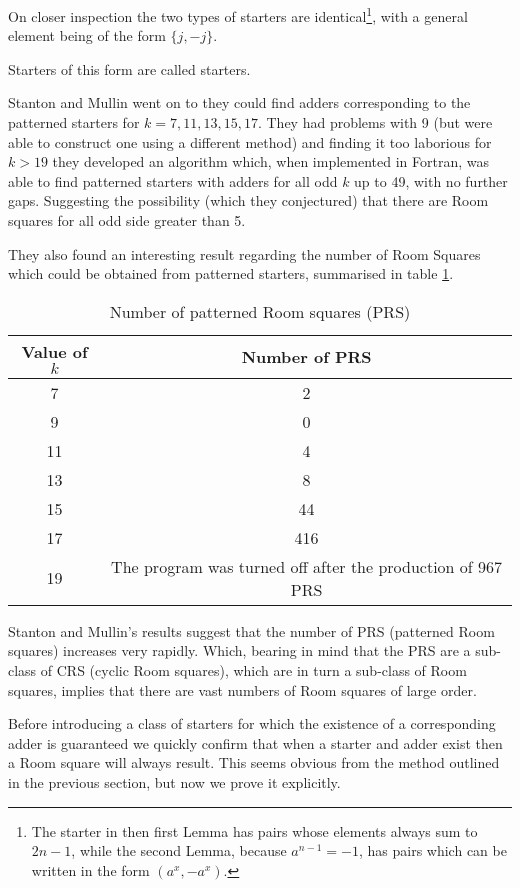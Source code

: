 On closer inspection the two types of starters are identical\footnote{The starter in then first Lemma has pairs whose elements always sum to $2n-1$, while the second Lemma, because $a^{n-1}=-1$, has pairs which can be written in the form $(a^x,-a^x)$.}, with a general element being of the form $\{j, -j\}$.

Starters of this form are called  starters.

Stanton and Mullin went on to they could find adders corresponding to the patterned starters for $k = 7, 11, 13, 15, 17$.
They had problems with 9 (but were able to construct one using a different method) and finding it too laborious for $k > 19$ they developed an algorithm which, when implemented in Fortran, was able to find patterned starters with adders for all odd $k$ up to 49, with no further gaps.
Suggesting the possibility (which they conjectured) that there are Room squares for all odd side greater than 5.

They also found an interesting result regarding the number of Room Squares which could be obtained from patterned starters, summarised in table \ref{tab:patterned}. 

\begin{table}[h!]
  \begin{center}
    \begin{tabular}{c|c}
    Value of $k$ & Number of PRS \\ \hline
    7 & 2 \\
    9 & 0 \\
    11 & 4 \\
    13 & 8 \\
    15 & 44 \\
    17 & 416 \\
    19 & The program was turned off after the production of 967 PRS
    \end{tabular}
  \end{center}
  \caption{Number of patterned Room squares (PRS)}
  \label{tab:patterned}
\end{table}

Stanton and Mullin’s results suggest that the number of PRS (patterned Room squares) increases very rapidly.
Which, bearing in mind that the PRS are a sub-class of CRS (cyclic Room squares), which are in turn a sub-class of Room squares, implies that there are vast numbers of Room squares of large order.

Before introducing a class of starters for which the existence of a corresponding adder is guaranteed we quickly confirm that when a starter and adder exist then a Room square will always result.
This seems obvious from the method outlined in the previous section, but now we prove it explicitly.

